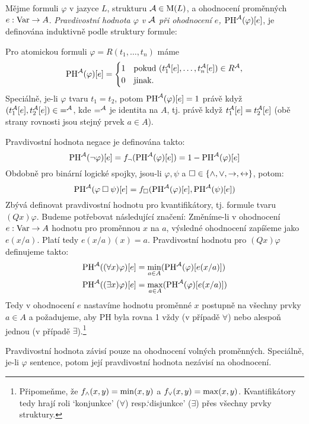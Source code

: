 \begin{definition}
Mějme formuli $\varphi$ v jazyce $L$, strukturu $\mathcal{A}\in\operatorname{M}(L)$,  a ohodnocení proměnných $e:\operatorname{Var}\to A$. \emph{Pravdivostní hodnota $\varphi$ v $\mathcal{A}$ při ohodnocení $e$, $\mathrm{PH}^{\mathcal{A}}(\varphi)[e]$}, je definována induktivně podle struktury formule:

Pro atomickou formuli $\varphi=R(t_1,\dots,t_n)$ máme 
$$
\mathrm{PH}^{\mathcal{A}}(\varphi)[e]=
\begin{cases}
    1 & \text{pokud }(t_1^{\mathcal{A}}[e],\dots,t_n^{\mathcal{A}}[e])\in R^{\mathcal{A}},\\
    0 & \text{jinak.}    
\end{cases}
$$
Speciálně, je-li $\varphi$ tvaru $t_1=t_2$, potom $\mathrm{PH}^{\mathcal{A}}(\varphi)[e]=1$ právě když $(t_1^{\mathcal{A}}[e],t_2^{\mathcal{A}}[e])\in {=^{\mathcal{A}}}$, kde $=^{\mathcal{A}}$ je identita na $A$, tj. právě když $t_1^{\mathcal{A}}[e]=t_2^{\mathcal{A}}[e]$ (obě strany rovnosti jsou stejný prvek $a\in A$).

Pravdivostní hodnota negace je definována takto:
$$
\mathrm{PH}^{\mathcal{A}}(\neg \varphi)[e]=f_\neg(\mathrm{PH}^{\mathcal{A}}(\varphi)[e])=1-\mathrm{PH}^{\mathcal{A}}(\varphi)[e]
$$
Obdobně pro binární logické spojky, jsou-li $\varphi,\psi$ a ${\mathbin{\square}}\in\{{\land},{\lor},{\mathbin{\rightarrow}},{\mathbin{\leftrightarrow}}\}$, potom:
$$
\mathrm{PH}^{\mathcal{A}}(\varphi\mathbin{\square}\psi)[e]=f_{\mathbin{\square}}(\mathrm{PH}^{\mathcal{A}}(\varphi)[e],\mathrm{PH}^{\mathcal{A}}(\psi)[e])
$$
Zbývá definovat pravdivostní hodnotu pro kvantifikátory, tj. formule tvaru $(Qx)\varphi$. Budeme potřebovat následující značení: Změníme-li v ohodnocení $e:\operatorname{Var}\to A$ hodnotu pro proměnnou $x$ na $a$, výsledné ohodnocení zapíšeme jako $e(x/a)$. Platí tedy $e(x/a)(x)=a$. Pravdivostní hodnotu pro $(Qx)\varphi$ definujeme takto:
\begin{align*}
    \mathrm{PH}^{\mathcal{A}}((\forall x)\varphi)[e]&=\min_{a\in A}(\mathrm{PH}^{\mathcal{A}}(\varphi)[e(x/a)])\\ 
    \mathrm{PH}^{\mathcal{A}}((\exists x)\varphi)[e]&=\max_{a\in A}(\mathrm{PH}^{\mathcal{A}}(\varphi)[e(x/a)])
\end{align*}
Tedy v ohodnocení $e$ nastavíme hodnotu proměnné $x$ postupně na všechny prvky $a\in A$ a požadujeme, aby PH byla rovna 1 vždy (v případě $\forall$) nebo alespoň jednou (v případě $\exists$).\footnote{Připomeňme, že $f_{\land}(x,y)=\min(x,y)$ a $f_{\lor}(x,y)=\max(x,y)$. Kvantifikátory tedy hrají roli `konjunkce' ($\forall$) resp.`disjunkce' ($\exists$) přes všechny prvky struktury.}
\end{definition}

\begin{remark}
    Pravdivostní hodnota závisí pouze na ohodnocení volných proměnných. Speciálně, je-li $\varphi$ sentence, potom její pravdivostní hodnota nezávisí na ohodnocení.
\end{remark}

